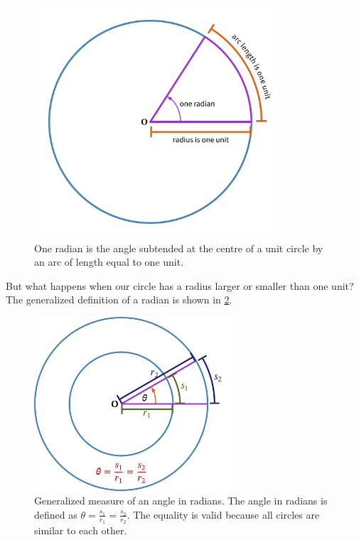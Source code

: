 \documentclass[
  a4paper,
]{article}
\begin{document}
\begin{figure}
\hypertarget{fig:radian}{%
\centering
\includegraphics[width=0.8\textwidth,height=\textheight]{images/one-radian.png}
\caption{One radian is the angle subtended at the centre of a unit
circle by an arc of length equal to one unit.}\label{fig:radian}
}
\end{figure}

But what happens when our circle has a radius larger or smaller than one
unit? The generalized definition of a radian is shown in
\cref{fig:general}.

\begin{figure}
\hypertarget{fig:general}{%
\centering
\includegraphics[width=0.65\textwidth,height=\textheight]{images/general-radian.png}
\caption{Generalized measure of an angle in radians. The angle in
radians is defined as \(\theta = \frac{s_1}{r_1} = \frac{s_2}{r_2}\).
The equality is valid because all circles are similar to each
other.}\label{fig:general}
}
\end{figure}
\end{document}
